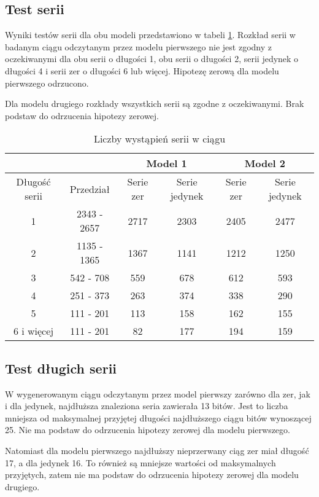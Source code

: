 \subsection{Test serii}

Wyniki testów serii dla obu modeli przedstawiono w tabeli \ref{serieTabela}. Rozkład serii w badanym ciągu odczytanym
przez modelu pierwszego nie jest zgodny z oczekiwanymi dla obu serii o długości 1, obu serii o długości 2, serii jedynek 
o długości 4 i serii zer o długości 6 lub więcej. Hipotezę zerową dla modelu pierwszego odrzucono.

Dla modelu drugiego rozkłady wszystkich serii są zgodne z oczekiwanymi. Brak podstaw do odrzucenia hipotezy zerowej.
\begin{table}[H]
    \centering
    \caption{Liczby wystąpień serii w ciągu}
    \label{serieTabela}
    \begin{tabular}{|c|c|c|c|c|c|} 
        \hline
        \multicolumn{2}{|c|}{} & \multicolumn{2}{c|}{Model 1} & \multicolumn{2}{c|}{Model 2} \\
        \hline
        Długość serii & Przedział & Serie zer & Serie jedynek & Serie zer & Serie jedynek \\
        \hline
        1 & 2343 - 2657 & 2717 & 2303 & 2405 & 2477 \\
        \hline
        2 & 1135 - 1365 & 1367 & 1141 & 1212 & 1250 \\
        \hline
        3 & 542 - 708 & 559 & 678 & 612 & 593 \\
        \hline
        4 & 251 - 373 & 263 & 374 & 338 & 290 \\
        \hline
        5 & 111 - 201 & 113 & 158 & 162 & 155 \\
        \hline
        6 i więcej & 111 - 201 & 82 & 177 & 194 & 159 \\
        \hline  
    \end{tabular} 
\end{table}   

\subsection{Test długich serii}
W wygenerowanym ciągu odczytanym przez model pierwszy zarówno dla zer, jak i dla jedynek, najdłuższa znaleziona seria 
zawierała 13 bitów. Jest to liczba mniejsza od maksymalnej przyjętej długości najdłuższego ciągu bitów wynoszącej 25. 
Nie ma podstaw do odrzucenia hipotezy zerowej dla modelu pierwszego. \par
Natomiast dla modelu pierwszego najdłuższy nieprzerwany ciąg zer miał długość 17, a dla jedynek 16. To również są 
mniejsze wartości od maksymalnych przyjętych, zatem nie ma podstaw do odrzucenia hipotezy zerowej dla modelu drugiego.

